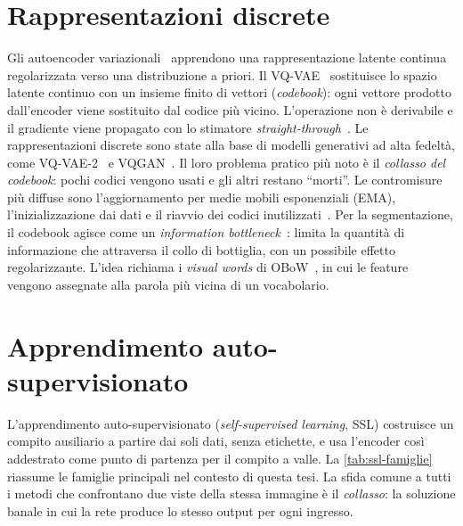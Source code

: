 \section{Rappresentazioni discrete}
\label{sec:stato-discrete}

Gli autoencoder variazionali~\cite{kingma2014vae} apprendono una rappresentazione latente
continua regolarizzata verso una distribuzione a priori. Il VQ-VAE~\cite{vandenoord2017vqvae}
sostituisce lo spazio latente continuo con un insieme finito di vettori (\emph{codebook}): ogni
vettore prodotto dall'encoder viene sostituito dal codice più vicino. L'operazione non è
derivabile e il gradiente viene propagato con lo stimatore
\emph{straight-through}~\cite{bengio2013straight}. Le rappresentazioni discrete sono state alla
base di modelli generativi ad alta fedeltà, come VQ-VAE-2~\cite{razavi2019vqvae2} e
VQGAN~\cite{esser2021taming}. Il loro problema pratico più noto è il \emph{collasso del
codebook}: pochi codici vengono usati e gli altri restano \enquote{morti}. Le contromisure più
diffuse sono l'aggiornamento per medie mobili esponenziali (EMA), l'inizializzazione dai dati e
il riavvio dei codici inutilizzati~\cite{lancucki2020robust}. Per la segmentazione, il codebook
agisce come un \emph{information bottleneck}~\cite{tishby2000ib}: limita la quantità di
informazione che attraversa il collo di bottiglia, con un possibile effetto regolarizzante.
L'idea richiama i \emph{visual words} di OBoW~\cite{gidaris2021obow}, in cui le feature vengono
assegnate alla parola più vicina di un vocabolario.

\section{Apprendimento auto-supervisionato}
\label{sec:stato-ssl}

L'apprendimento auto-supervisionato (\emph{self-supervised learning}, SSL) costruisce un compito
ausiliario a partire dai soli dati, senza etichette, e usa l'encoder così addestrato come punto
di partenza per il compito a valle. La \cref{tab:ssl-famiglie} riassume le famiglie principali
nel contesto di questa tesi. La sfida comune a tutti i metodi che confrontano due viste della
stessa immagine è il \emph{collasso}: la soluzione banale in cui la rete produce lo stesso
output per ogni ingresso.

